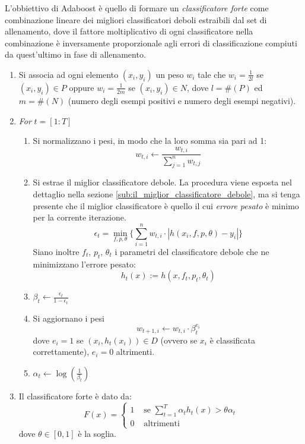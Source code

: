 \documentclass[a4paper,11pt,oneside]{article}
\begin{document}
			L'obbiettivo di Adaboost è quello di formare un \emph{classificatore forte} come combinazione lineare dei migliori classificatori deboli estraibili dal set di allenamento, dove il fattore moltiplicativo di ogni classificatore nella combinazione è inversamente proporzionale agli errori di classificazione compiuti da quest'ultimo in fase di allenamento.

			\begin{enumerate}
				\item Si associa ad ogni elemento $(x_i, y_i)$ un peso $w_i$ tale che $w_i = \frac{1}{2l}$ se $(x_i, y_i) \in P$ oppure $w_i = \frac{1}{2m}$ se $(x_i, y_i) \in N$, dove $l = \#(P)$ ed $m = \#(N)$ (numero degli esempi positivi e numero degli esempi negativi).

				\item \emph{For} $t = [1:T]$
					\begin{enumerate}
						\item Si normalizzano i pesi, in modo che la loro somma sia pari ad 1:
						$$ w_{t,i} \leftarrow \frac{w_{t,i}}{\sum_{j = 1}^{n}w_{t,j}}$$

						\item \label{adaboost_minimum_error}
						Si estrae il miglior classificatore debole. La procedura viene esposta nel dettaglio nella sezione \ref{sub:il_miglior_classificatore_debole}, ma si tenga presente che il miglior classificatore è quello il cui \emph{errore pesato} è minimo per la corrente iterazione.
						$$ \epsilon_t = \min_{f,p,\theta} \{
							\sum_{i = 1}^{n} w_{t,i} \cdot |h(x_i, f, p, \theta) - y_i|
						\} $$
						Siano inoltre $f_t$, $p_t$, $\theta_t$ i parametri del classificatore debole che ne minimizzano l'errore pesato:
						$$ h_t(x) := h(x, f_t, p_t, \theta_t) $$

						\item \label{adaboost_beta} $\beta_t \leftarrow \frac{\epsilon_t}{1 - \epsilon_t}$

						\item \label{adaboost_update_weights} Si aggiornano i pesi
						$$ w_{t+1, i} \leftarrow w_{t,i} \cdot \beta_{t}^{e_i} $$
						dove $e_i = 1$ se $(x_i, h_t(x_i)) \in D$ (ovvero se $x_i$ è classificata correttamente), $e_i = 0$ altrimenti.

						\item $\alpha_t \leftarrow \log(\frac{1}{\beta_t})$
					\end{enumerate}

				\item \label{adaboost_strong_classifier} Il classificatore forte è dato da:
				\begin{equation}
					F(x) = \begin{cases}
						1 & \text{ se } \sum_{t = 1}^{T} \alpha_t h_t(x) > \theta \alpha_t \\
						0 & \text{ altrimenti }
					\end{cases}
				\end{equation}
				dove $\theta \in [0,1]$ è la soglia.
			\end{enumerate}
\end{document}
